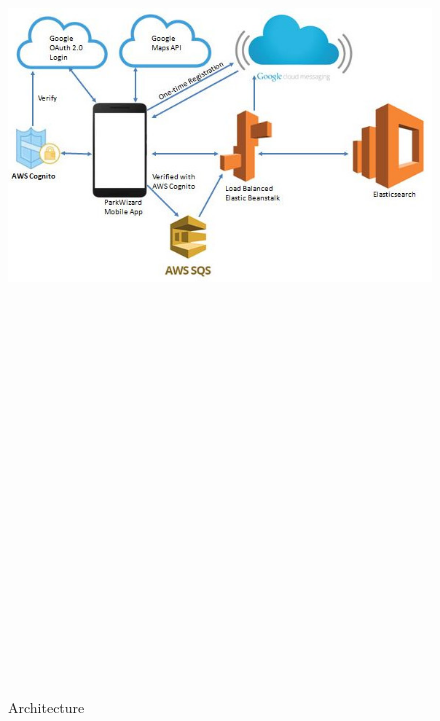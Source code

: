 \documentclass[final]{beamer}
\newlength{\onecolwid}
\begin{document}
\begin{frame}[t]
\begin{columns}[t]
\begin{column}{\onecolwid}
\begin{figure}
\includegraphics[width=50cm,height=29cm]{architecture_2.JPG}
\caption{Architecture}
\end{figure}


\end{column}
\end{columns}
\end{frame}
\end{document}
